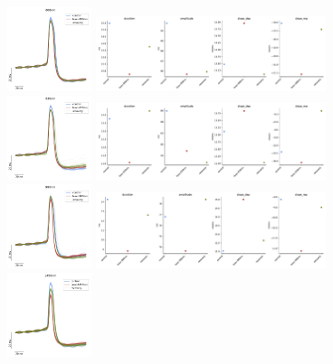 \begin{figure}[hbt!]
	\centering
	\includegraphics[width=0.22\textwidth]{img/laser/wavelength/808nm.png}
	\includegraphics[width=0.6\textwidth]{img/laser/wavelength/808nmmetrics.pdf}
	\centering
	\includegraphics[width=0.22\textwidth]{img/laser/wavelength/830nm.png}
	\includegraphics[width=0.6\textwidth]{img/laser/wavelength/830nmmetrics.pdf}
	\centering
	\includegraphics[width=0.22\textwidth]{img/laser/wavelength/980nm.png}
	\includegraphics[width=0.6\textwidth]{img/laser/wavelength/980nmmetrics.pdf}
	\centering
	\includegraphics[width=0.22\textwidth]{img/laser/wavelength/1450nm.png}

\end{figure}
